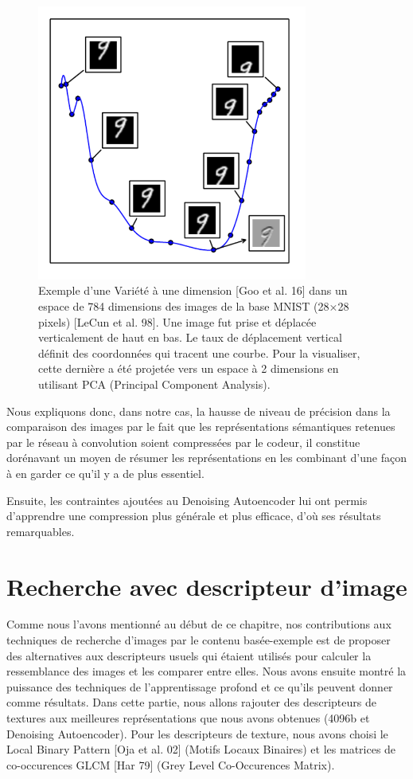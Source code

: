 \begin{figure}[H]
	\centering
		\includegraphics[width=3.5in]{Figures/manifold.png}
	\caption[Res]{Exemple d'une Variété à une dimension [Goo et al. 16] dans un espace de 784 dimensions des images de la base MNIST (28×28 pixels) [LeCun et al. 98]. Une image fut prise et déplacée verticalement de haut en bas. Le taux de déplacement vertical définit des coordonnées qui tracent une courbe. Pour la visualiser, cette dernière a été projetée vers un espace à 2 dimensions en utilisant PCA (Principal Component Analysis).}
	\label{fig:Electron}
\end{figure}


	Nous expliquons donc, dans notre cas, la hausse de niveau de précision dans la comparaison des images par le fait que les représentations sémantiques retenues par le réseau à convolution soient compressées par le codeur, il constitue dorénavant un moyen de résumer les représentations en les combinant d'une façon à en garder ce qu'il y a de plus essentiel.

Ensuite, les contraintes ajoutées au Denoising Autoencoder lui ont permis d'apprendre une compression plus générale et plus efficace, d’où ses résultats remarquables.


\section{Recherche avec descripteur d'image}
	Comme nous l'avons mentionné au début de ce chapitre, nos contributions aux techniques de recherche d'images par le contenu basée-exemple est de proposer des alternatives aux descripteurs usuels qui étaient utilisés pour calculer la ressemblance des images et les comparer entre elles. Nous avons ensuite montré la puissance des techniques de l'apprentissage profond et ce qu'ils peuvent donner comme résultats. Dans cette partie, nous allons rajouter des descripteurs de textures aux meilleures représentations que nous avons obtenues (4096b et Denoising Autoencoder). Pour les descripteurs de texture, nous avons choisi le Local Binary Pattern [Oja et al. 02] (Motifs Locaux Binaires) et les matrices de co-occurences GLCM [Har 79] (Grey Level Co-Occurences Matrix).

